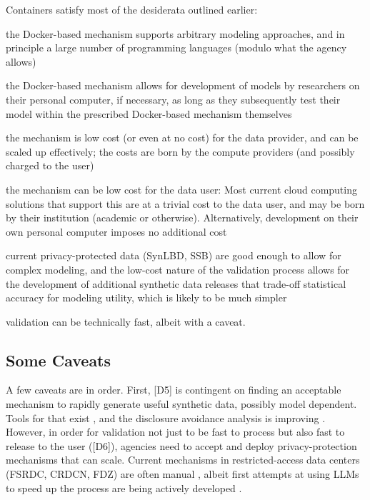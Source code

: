\documentclass[inline]{hdsr}
\begin{document}
Containers satisfy most of the desiderata outlined earlier: 
\begin{enumerate*}[label={[D\arabic*]}, itemjoin={{; }}, itemjoin*={{, and }}]
    \item the Docker-based mechanism supports arbitrary modeling approaches, and in principle a large number of programming languages (modulo what the agency allows)
    \item the Docker-based mechanism  allows for development of models by researchers on their personal computer, if necessary, as long as they subsequently test their model within the prescribed Docker-based mechanism themselves
    \item the mechanism is low cost (or even at no cost) for the data provider, and can be scaled up effectively; the costs are born by the compute providers (and possibly charged to the user)
    \item the mechanism can be low cost for the data user: Most current cloud computing solutions that support this are at a trivial cost to the data user, and may be born by their institution (academic or otherwise). Alternatively, development on their own personal computer imposes no additional cost
    \item current privacy-protected data (SynLBD, SSB) are  good enough to allow for complex modeling, and the low-cost nature of the validation process allows for the development of additional synthetic data releases that trade-off statistical accuracy for modeling utility, which is likely to be much simpler
    \item validation can be technically fast, albeit with a caveat.
\end{enumerate*}

\subsection{Some Caveats}

A few caveats are in order. First, [D5] is contingent on finding an acceptable mechanism to rapidly generate useful synthetic data, possibly model dependent. Tools for that exist \citep{synthpop,synthpop2016}, and the disclosure avoidance analysis is improving \citep{SnokeEtAl2017}. However, in order for validation not just to be fast to process but also fast to release to the user ([D6]), agencies need to accept and deploy privacy-protection mechanisms that can scale. Current mechanisms in restricted-access data centers (\ac{FSRDC}, \ac{CRDCN}, \ac{FDZ}) are often manual \citep{brandt_guidelines_2010}, albeit first attempts at using \acp{LLM} to speed up the process are being actively developed \citep{rigaud_checking_2023}.
\end{document}
